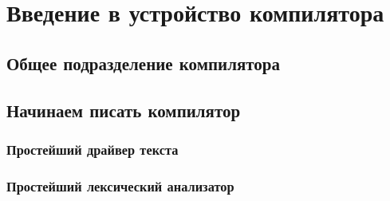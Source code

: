 \part{Введение в устройство компилятора}

\chapter{Общее подразделение компилятора}


\chapter{Начинаем писать компилятор}

\section{Простейший драйвер текста}


\section{Простейший лексический анализатор}

